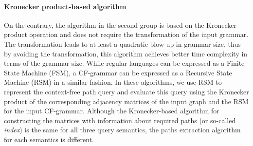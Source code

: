 \documentclass[sigconf, nonacm]{acmart}
\begin{document}
\paragraph{Kronecker product-based algorithm}
On the contrary, the algorithm in the second group is based on the Kronecker product operation and does not require the transformation of the input grammar. The transformation leads to at least a quadratic blow-up in
grammar size, thus by avoiding the transformation, this algorithm achieves better time complexity in terms of the grammar size. While regular languages can be expressed as a Finite-State Machine (FSM), a CF-grammar can be expressed as a Recursive State Machine (RSM) in a similar
fashion. In these algorithms, we use RSM to represent the context-free path query and evaluate this query using the Kronecker product of the corresponding adjacency matrices of the input graph and the RSM for the input CF-grammar. Although the Kronecker-based algorithm for constructing the matrices with information about required paths (or so-called \textit{index}) is the same for all three query semantics, the paths extraction algorithm for each semantics is different.
\end{document}
